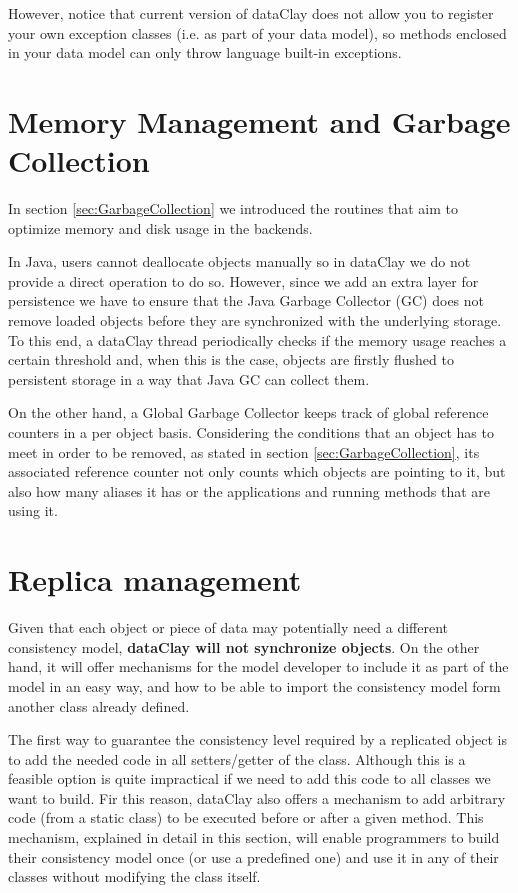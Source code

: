 However, notice that current version of dataClay does not allow you to register your own exception classes (i.e. as part of your data model), so methods enclosed in your data model can only throw language built-in exceptions.

\section {Memory Management and Garbage Collection}

In section \ref{sec:GarbageCollection} we introduced the routines that aim to optimize memory and disk usage in the backends.

In Java, users cannot deallocate objects manually so in dataClay we do not provide a direct operation to do so. However, since we add an extra layer for persistence we have to ensure that the Java Garbage Collector (GC) does not remove loaded objects before they are synchronized with the underlying storage. To this end, a dataClay thread periodically checks if the memory usage reaches a certain threshold and, when this is the case, objects are firstly flushed to persistent storage in a way that Java GC can collect them.

On the other hand, a Global Garbage Collector keeps track of global reference counters in a per object basis. Considering the conditions that an object has to meet in order to be removed, as stated in section \ref{sec:GarbageCollection}, its associated reference counter not only counts which objects are pointing to it, but also how many aliases it has or the applications and running methods that are using it.

\section{Replica management}
\label{sec:JavaReplication}

Given that each object or piece of data may potentially need a different consistency model, {\bf dataClay will not synchronize objects}. On the other hand, it will offer mechanisms for the model developer to include it as part of the model in an easy way, and how to be able to import the consistency model form another class already defined.

The first way to guarantee the consistency level required by a replicated object is to add the needed code in all setters/getter of the class. Although this is a feasible option is quite impractical if we need to add this code to all classes we want to build. Fir this reason, dataClay also offers a mechanism to add arbitrary code (from a static class) to be executed before or after a given method. This mechanism, explained in detail in this section, will enable programmers to build their consistency model once (or use a predefined one) and use it in any of their classes without modifying the class itself.

